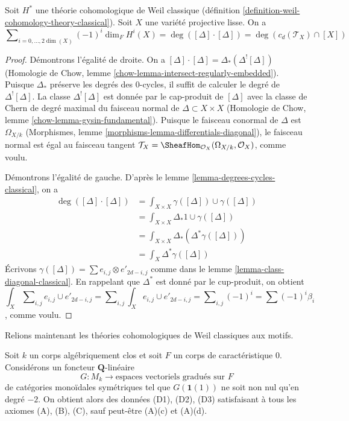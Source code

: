 \begin{lemma}
\label{lemma-square-diagonal-classical}
Soit $H^*$ une théorie cohomologique de Weil classique
(définition \ref{definition-weil-cohomology-theory-classical}).
Soit $X$ une variété projective lisse. On a
$$
\sum\nolimits_{i = 0, \ldots, 2\dim(X)} (-1)^i\dim_F H^i(X) =
\deg([\Delta] \cdot [\Delta]) = \deg(c_d(\mathcal{T}_X) \cap [X])
$$
\end{lemma}

\begin{proof}
Démontrons l'égalité de droite. On a
$[\Delta] \cdot [\Delta] = \Delta_*(\Delta^![\Delta])$
(Homologie de Chow, lemme \ref{chow-lemma-intersect-regularly-embedded}).
Puisque $\Delta_*$ préserve les degrés des $0$-cycles, il suffit de calculer
le degré de $\Delta^![\Delta]$. La classe $\Delta^![\Delta]$ est donnée
par le cap-produit de $[\Delta]$ avec
la classe de Chern de degré maximal du faisceau normal de $\Delta \subset X \times X$
(Homologie de Chow, lemme \ref{chow-lemma-gysin-fundamental}).
Puisque le faisceau conormal de $\Delta$ est $\Omega_{X/k}$
(Morphismes, lemme \ref{morphisms-lemma-differentials-diagonal}),
le faisceau normal est égal au faisceau tangent
$\mathcal{T}_X = \SheafHom_{\mathcal{O}_X}(\Omega_{X/k}, \mathcal{O}_X)$,
comme voulu.

\medskip\noindent
Démontrons l'égalité de gauche. D'après le lemme \ref{lemma-degrees-cycles-classical}, on a
\begin{align*}
\deg([\Delta] \cdot [\Delta])
& =
\int_{X \times X} \gamma([\Delta]) \cup \gamma([\Delta]) \\
& =
\int_{X \times X} \Delta_*1 \cup \gamma([\Delta]) \\
& =
\int_{X \times X} \Delta_*(\Delta^*\gamma([\Delta])) \\
& =
\int_X \Delta^*\gamma([\Delta])
\end{align*}
Écrivons $\gamma([\Delta]) = \sum  e_{i, j} \otimes e'_{2d - i , j}$
comme dans le lemme \ref{lemma-class-diagonal-classical}.
En rappelant que $\Delta^*$ est donné par le cup-produit, on obtient
$$
\int_X \sum\nolimits_{i, j} e_{i, j} \cup e'_{2d - i, j} =
\sum\nolimits_{i, j} \int_X e_{i, j} \cup e'_{2d - i, j} =
\sum\nolimits_{i, j} (-1)^i = \sum (-1)^i\beta_i
$$,
comme voulu.
\end{proof}




\noindent
Relions maintenant les théories cohomologiques de Weil classiques aux motifs.

\begin{lemma}
\label{lemma-from-functor-to-weil-classical}
Soit $k$ un corps algébriquement clos et soit $F$ un corps de
caractéristique $0$. Considérons un foncteur $\mathbf{Q}$-linéaire
$$
G : M_k \longrightarrow \text{espaces vectoriels gradués sur }F\text{}
$$
de catégories monoïdales symétriques tel que $G(\mathbf{1}(1))$
ne soit non nul qu'en degré $-2$. On obtient alors des données (D1), (D2), (D3)
satisfaisant à tous les axiomes (A), (B), (C), sauf peut-être (A)(c) et (A)(d).
\end{lemma}

